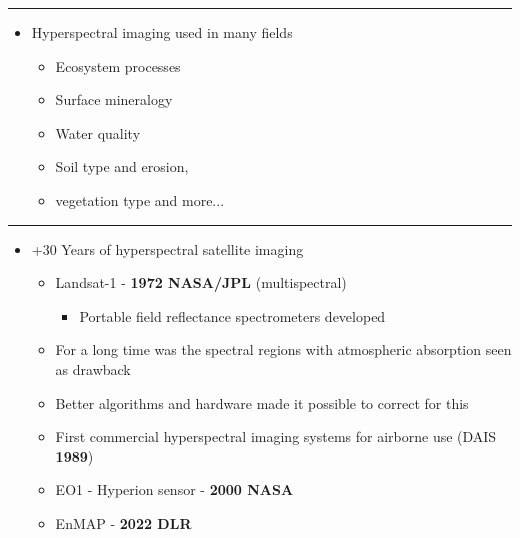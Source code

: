 \documentclass[12pt,preprintnumbers,amsmath,amssymb,nofootinbib,superscriptaddress]{revtex4-1}
\begin{document}
\newpage
{}
\vspace{-0.2cm}
\hrule
\vspace{0.8cm}
\begin{minipage}{0.6\textwidth}

  \begin{itemize}
    \item Hyperspectral imaging used in many fields 
      \begin{itemize}
        \item Ecosystem processes
        \item Surface mineralogy
        \item Water quality
        \item Soil type and erosion, 
        \item vegetation type and more...
      \end{itemize}
  \end{itemize}

\end{minipage}
\vspace{\fill}


\newpage
{}
\vspace{-0.2cm}
\hrule
\vspace{0.8cm}
\begin{minipage}{0.6\textwidth}
  \begin{itemize}
    \item +30 Years of hyperspectral satellite imaging
    \begin{itemize}
      \item Landsat-1 - \textbf{1972 NASA/JPL} (multispectral)
      \begin{itemize}
        \item Portable field reflectance spectrometers developed
      \end{itemize}
      \item For a long time was the spectral regions with atmospheric absorption seen as drawback
      \item Better algorithms and hardware made it possible to correct for this
      \item First commercial hyperspectral imaging systems for airborne use (DAIS \textbf{1989})
      \item EO1 - Hyperion sensor - \textbf{2000 NASA} %
      \item EnMAP - \textbf{2022 DLR}
    \end{itemize}
  \end{itemize}

\end{minipage}
\vspace{\fill}
\end{document}
